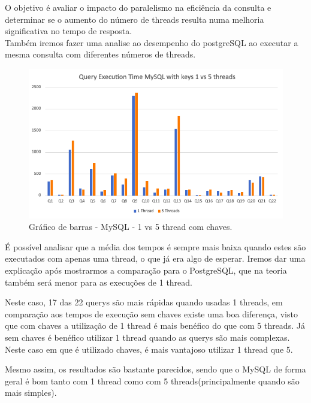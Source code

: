 \documentclass{article}
\begin{document}
  O objetivo é avaliar o impacto do paralelismo na eficiência da consulta e determinar se o aumento do número de threads resulta numa melhoria significativa no tempo de resposta.\\

  Também iremos fazer uma analise ao desempenho do postgreSQL ao executar a mesma consulta com diferentes números de threads.

  \begin{figure}[H]
    \centering
    \includegraphics[width=\textwidth]{Graphs/mysql_withkeys_1vs5threads.png}
    \caption{Gráfico de barras - MySQL - 1 vs 5 thread com chaves.} 
    \label{fig:PKCreation2}

  \end{figure}

  \texttt{}\par É possível analisar que a média dos tempos é sempre mais baixa quando estes são executados com apenas uma thread, o que já era algo de esperar. Iremos dar uma explicação após mostrarmos a comparação para o PostgreSQL, que na teoria também será menor para as execuções de 1 thread.
    
  Neste caso, 17 das 22 querys são mais rápidas quando usadas 1 threads, em comparação aos tempos de execução sem chaves existe uma boa diferença, visto que com chaves a utilização de 1 thread é mais benéfico do que com 5 threads. Já sem chaves é benéfico utilizar 1 thread quando as querys são mais complexas. Neste caso em que é utilizado chaves, é mais vantajoso utilizar 1 thread que 5.

  Mesmo assim, os resultados são bastante parecidos, sendo que o MySQL de forma geral é bom tanto com 1 thread como com 5 threads(principalmente quando são mais simples).
\end{document}
